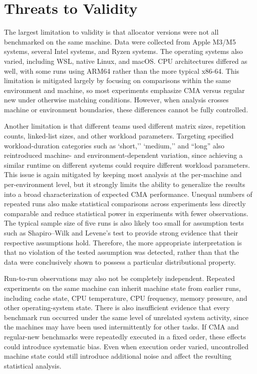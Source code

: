 \clearpage

\section{Threats to Validity}
\label{sec:threats-to-validity}

The largest limitation to validity is that allocator versions were not all benchmarked on the same machine. Data were collected from Apple M3/M5 systems, several Intel systems, and Ryzen systems. The operating systems also varied, including WSL, native Linux, and macOS. CPU architectures differed as well, with some runs using ARM64 rather than the more typical x86-64. This limitation is mitigated largely by focusing on comparisons within the same environment and machine, so most experiments emphasize CMA versus regular new under otherwise matching conditions. However, when analysis crosses machine or environment boundaries, these differences cannot be fully controlled.

Another limitation is that different teams used different matrix sizes, repetition counts, linked-list sizes, and other workload parameters. Targeting specified workload-duration categories such as `short,'' `medium,'' and ``long'' also reintroduced machine- and environment-dependent variation, since achieving a similar runtime on different systems could require different workload parameters. This issue is again mitigated by keeping most analysis at the per-machine and per-environment level, but it strongly limits the ability to generalize the results into a broad characterization of expected CMA performance. Unequal numbers of repeated runs also make statistical comparisons across experiments less directly comparable and reduce statistical power in experiments with fewer observations. The typical sample size of five runs is also likely too small for assumption tests such as Shapiro--Wilk and Levene's test to provide strong evidence that their respective assumptions hold. Therefore, the more appropriate interpretation is that no violation of the tested assumption was detected, rather than that the data were conclusively shown to possess a particular distributional property.

Run-to-run observations may also not be completely independent. Repeated experiments on the same machine can inherit machine state from earlier runs, including cache state, CPU temperature, CPU frequency, memory pressure, and other operating-system state. There is also insufficient evidence that every benchmark run occurred under the same level of unrelated system activity, since the machines may have been used intermittently for other tasks. If CMA and regular-new benchmarks were repeatedly executed in a fixed order, these effects could introduce systematic bias. Even when execution order varied, uncontrolled machine state could still introduce additional noise and affect the resulting statistical analysis.


